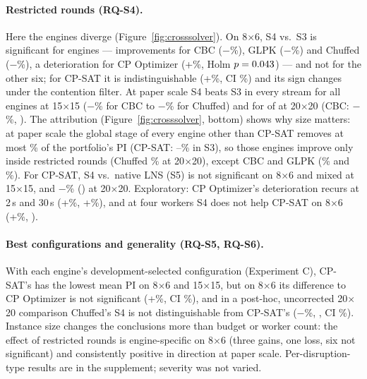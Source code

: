 \documentclass[letterpaper]{article} %
\begin{document}
\paragraph{Restricted rounds (RQ-S4).} Here the engines diverge (Figure~\ref{fig:crosssolver}). On 8$\times$6, S4 vs.\ S3 is significant for \MSBSSFourVsSThreeSig{} engines --- improvements for CBC ($-$\MSBScbcCbcSFourVsSThreeRel\%), GLPK ($-$\MSBSglpkGlpkSFourVsSThreeRel\%) and Chuffed ($-$\MSBSchuffedChuffedSFourVsSThreeRel\%), a deterioration for CP Optimizer (+\MSBScpoptimizerCpoptimizerSFourVsSThreeRel\%, Holm $p=0.043$) --- and not for the other six; for CP-SAT it is indistinguishable (+\MSBScpsatCpsatSFourVsSThreeRel\%, CI \MSBScpsatCpsatSFourVsSThreeCIRel\%) and its sign changes under the contention filter. At paper scale S4 beats S3 in every stream for all \MSBMOneFiveSFourVsSThreeAllStreams{} engines at 15$\times$15 ($-$\MSBMOneFivecbcCbcSFourVsSThreeRel\% for CBC to $-$\MSBMOneFivechuffedChuffedSFourVsSThreeRel\% for Chuffed) and for \MSBMTwoZeroSFourVsSThreeAllStreams{} of \MSBMTwoZeroSFourVsSThreeEngines{} at 20$\times$20 (CBC: $-$\MSBMTwoZerocbcCbcSFourVsSThreeRel\%, \MSBMTwoZerocbcCbcSFourVsSThreeWL). The attribution (Figure~\ref{fig:crosssolver}, bottom) shows why size matters: at paper scale the global stage of every engine other than CP-SAT removes at most \MSAttrMaxGlobalOtherM\% of the portfolio's PI (CP-SAT: \MSAttrMTwoZeroCpsatSThreeGlobal--\MSAttrMOneFiveCpsatSThreeGlobal\% in S3), so those engines improve only inside restricted rounds (Chuffed \MSAttrMTwoZeroChuffedSFourRounds\% at 20$\times$20), except CBC and GLPK (\MSAttrMTwoZeroCbcSFourRounds\% and \MSAttrMTwoZeroGlpkSFourRounds\%). For CP-SAT, S4 vs.\ native LNS (S5) is not significant on 8$\times$6 and mixed at 15$\times$15, and $-$\MSBMTwoZerocpsatCpsatSFourVsSFiveRel\% (\MSBMTwoZerocpsatCpsatSFourVsSFiveWL) at 20$\times$20. Exploratory: CP Optimizer's deterioration recurs at 2\,s and 30\,s (+\MSRTwoSCpoptimizerSFourVsSThreeRel\%, +\MSRThreeZeroSCpoptimizerSFourVsSThreeRel\%), and at four workers S4 does not help CP-SAT on 8$\times$6 (+\MSWFourSCpsatSFourVsSThreeRel\%, \MSWFourSCpsatSFourVsSThreeWL).

\paragraph{Best configurations and generality (RQ-S5, RQ-S6).} With each engine's development-selected configuration (Experiment C), CP-SAT's has the lowest mean PI on 8$\times$6 and 15$\times$15, but on 8$\times$6 its difference to CP Optimizer is not significant (+\MSCSCpoptimizerSThreeVsCpsatSThreeRel\%, CI \MSCSCpoptimizerSThreeVsCpsatSThreeCIRel\%), and in a post-hoc, uncorrected 20$\times$20 comparison Chuffed's S4 is not distinguishable from CP-SAT's ($-$\MSPostMTwoZeroChuffedVsCpsatRel\%, \MSPostMTwoZeroChuffedVsCpsatWL, CI \MSPostMTwoZeroChuffedVsCpsatCIRel\%). Instance size changes the conclusions more than budget or worker count: the effect of restricted rounds is engine-specific on 8$\times$6 (three gains, one loss, six not significant) and consistently positive in direction at paper scale. Per-disruption-type results are in the supplement; severity was not varied.
\end{document}
